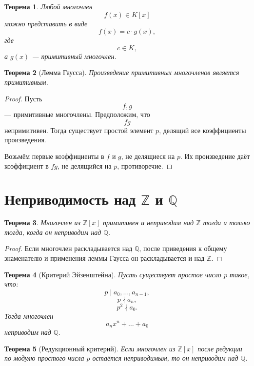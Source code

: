 \documentclass[12pt, a4paper]{article}
\newtheorem{theorem}{Теорема}
\theoremstyle{definition}
\theoremstyle{remark}
\newcommand{\Z}{\mathbb{Z}}
\newcommand{\Q}{\mathbb{Q}}
\begin{document}
\begin{theorem}
	Любой многочлен
	\[
	f(x)\in K[x]
	\]
	можно представить в виде
	\[
	f(x)=c\cdot g(x),
	\]
	где
	\[
	c\in K,
	\]
	а $g(x)$ --- примитивный многочлен.
\end{theorem}

\begin{theorem}[Лемма Гаусса]
	Произведение примитивных многочленов является примитивным.
\end{theorem}

\begin{proof}
	Пусть
	\[
	f,g
	\]
	--- примитивные многочлены. Предположим, что
	\[
	fg
	\]
	непримитивен. Тогда существует простой элемент $p$, делящий все коэффициенты
	произведения.
	
	Возьмём первые коэффициенты в $f$ и $g$, не делящиеся на $p$. Их произведение
	даёт коэффициент в $fg$, не делящийся на $p$, противоречие.
\end{proof}

\section{Неприводимость над $\Z$ и $\Q$}

\begin{theorem}
	Многочлен из $\Z[x]$ примитивен и неприводим над $\Z$ тогда и только тогда,
	когда он неприводим над $\Q$.
\end{theorem}

\begin{proof}
	Если многочлен раскладывается над $\Q$, после приведения к общему знаменателю
	и применения леммы Гаусса он раскладывается и над $\Z$.
\end{proof}

\begin{theorem}[Критерий Эйзенштейна]
	Пусть существует простое число $p$ такое, что:
	\[
	p\mid a_0,\dots,a_{n-1},
	\]
	\[
	p\nmid a_n,
	\]
	\[
	p^2\nmid a_0.
	\]
	Тогда многочлен
	\[
	a_nx^n+\dots+a_0
	\]
	неприводим над $\Q$.
\end{theorem}

\begin{theorem}[Редукционный критерий]
	Если многочлен из $\Z[x]$ после редукции по модулю простого числа $p$
	остаётся неприводимым, то он неприводим над $\Q$.
\end{theorem}

\end{document}
